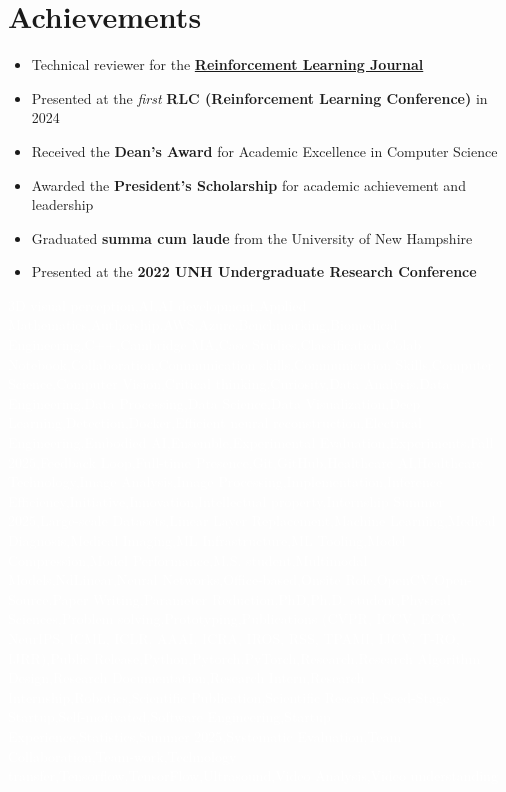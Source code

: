 \documentclass[letterpaper,11pt]{article}
\begin{document}
\section{Achievements}
\begin{itemize} %
    \item Technical reviewer for the \href{https://rlj.cs.umass.edu/}{\textbf{Reinforcement Learning Journal}}
    \item Presented at the \emph{first} \textbf{RLC (Reinforcement Learning Conference)} in 2024
    \item Received the \textbf{Dean's Award} for Academic Excellence in Computer Science
    \item Awarded the \textbf{President's Scholarship} for academic achievement and leadership
    \item Graduated \textbf{summa cum laude} from the University of New Hampshire
    \item Presented at the \textbf{2022 UNH Undergraduate Research Conference}
\end{itemize} %
\textcolor{white}{
3D visual perception,AI,AI development,Applied Mathematics,Authorship,AWS,Azure,Benchmarking,Biomedical Engineering,C++,Cambridge MA,Case Studies,Classification,Colab Notebook,Collaboration,Communication skills,Communication Skills,Computer Science,Computer Vision,Critical thinking,Curiosity,Data Analysis,Data Engineering,Data Processing,Data Science,Data Visualization,Deep Learning,Detection,Docker,Efficient neural reconstruction,Electrical Engineering,Embodied AI,Ensemble,Experimental Evaluation,Experiments,Fall 2025,Feedback Loop,Full-time Presence,Git,GitHub,Healthcare AI,Healthcare Technology,Image Analysis,Image Processing,Implementation,Inference Efficiency,Initiative,Innovation,Intellectual property,Internship Summer 2025,Large-scale Datasets,Linear Layer Replacement,Machine Learning,Medical Diagnosis,Medical Imaging,ML Infrastructure,ML Tooling,Model Compression,Model Performance,M.S. student,Multimodal Models,NdLinear,Neural Networks,Office-based,Onsite Role,OpenCV,Open-Source,Paper Writing,Parameter Reduction,PhD,Ph.D. student,Physical Sciences,Problem solving,Prototyping,Publications (CVPR, ICCV, ECCV, NeurIPS, ICML, ICLR, AAAI, ICRA, IROS, RSS, TPAMI, IJCV, T-RO, IJRR),Public Release,Python,Pytorch,PyTorch,Research,Research Algorithm Design,Research Documentation,Research Intern,Research Internship,Robotics,Scientific Publication,Scientific Research,Seed-Stage Startup,Self-motivated,Software Engineering,Startup Experience,Statistics,Summer 2025,Systematic Evaluation,Team Collaboration,Team-work,Technology transfer,Tensorflow,TensorFlow,Ultrasound,Video Analysis,Video understanding
}
\end{document}
